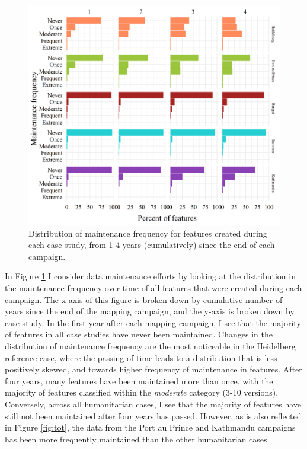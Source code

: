 \begin{figure} %
    \centering %
    \includegraphics[width = \textwidth]{Images/facetmaint.png} %
    \caption[Distribution of maintenance frequency for features created during each case study.]{Distribution of maintenance frequency for features created during each case study, from 1-4 years (cumulatively) since the end of each campaign.} %
    \label{fig:dist} %
\end{figure}

In Figure \ref{fig:dist} I consider data maintenance efforts by looking at the distribution in the maintenance frequency over time of all features that were created during each campaign. The x-axis of this figure is broken down by cumulative number of years since the end of the mapping campaign, and the y-axis is broken down by case study. In the first year after each mapping campaign, I see that the majority of features in all case studies have never been maintained. Changes in the distribution of maintenance frequency are the most noticeable in the Heidelberg reference case, where the passing of time leads to a distribution that is less positively skewed, and towards higher frequency of maintenance in features. After four years, many features have been maintained more than once, with the majority of features classified within the \textit{moderate} category (3-10 versions). Conversely, across all humanitarian cases, I see that the majority of features have still not been maintained after four years has passed. However, as is also reflected in Figure \ref{fig:tot}, the data from the Port au Prince and Kathmandu campaigns has been more frequently maintained than the other humanitarian cases. 

